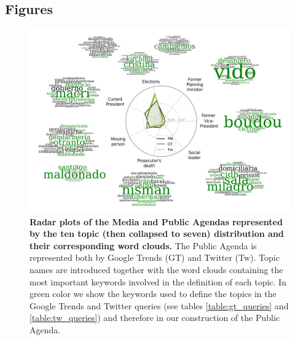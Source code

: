 \documentclass{bmcart}
\begin{document}
\begin{backmatter}



\section*{Figures}

\begin{figure}[h!]
\includegraphics[width = \textwidth]{Fig1.pdf}
\caption{\textbf{Radar plots of the Media and Public Agendas represented by the ten topic (then collapsed to seven) distribution and their corresponding word clouds.} The Public Agenda is represented both by Google Trends (GT) and Twitter (Tw). Topic names are introduced together with the word clouds containing the most important keywords involved in the definition of each topic. In green color we show the keywords used to define the topics in the Google Trends and Twitter queries (see tables \ref{table:gt_queries} and \ref{table:tw_queries}) and therefore in our construction of the Public Agenda.}
\label{fig:topics_wordclouds}
\end{figure}


\end{backmatter}
\end{document}
